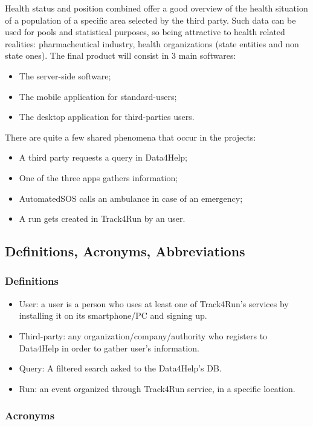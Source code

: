 Health status and position combined offer a good overview of the health situation of a population of a specific area selected by the third party. Such data can be used for pools and statistical purposes, so being attractive to health related realities: pharmacheutical industry, health organizations (state entities and non state ones).
The final product will consist in 3 main softwares:
\begin{itemize}
\item The server-side software;
\item The mobile application for standard-users;
\item The desktop application for third-parties users.
\end{itemize}
There are quite a few shared phenomena that occur in the projects:
\begin{itemize}
\item A third party requests a query in Data4Help;
\item One of the three apps gathers information;
\item AutomatedSOS calls an ambulance in case of an emergency;
\item A run gets created in Track4Run by an user.
\end{itemize}
{\color{secblue}\subsection{Definitions, Acronyms, Abbreviations}}
{\color{secblue}\subsubsection{Definitions}}
\begin{itemize}
\item User: a user is a person who uses at least one of Track4Run's services by installing it on its smartphone/PC and signing up.
\item Third-party: any organization/company/authority who registers to Data4Help in order to gather user's information.
\item Query: A filtered search asked to the Data4Help's DB.
\item Run: an event organized through Track4Run service, in a specific location.
\end{itemize}
{\color{secblue}\subsubsection{Acronyms}}
